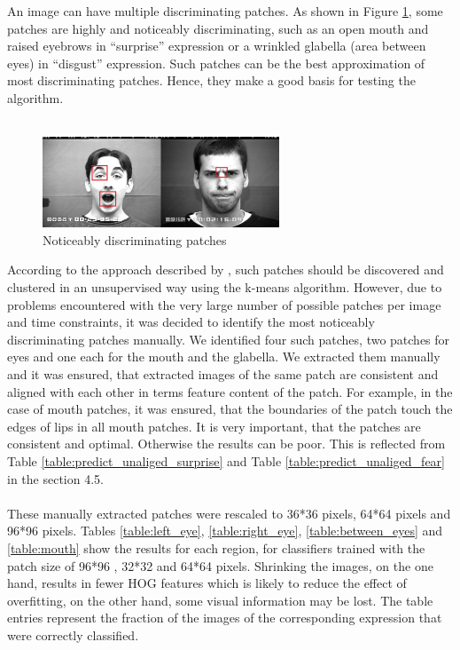 An image can have multiple discriminating patches. As shown in Figure \ref{fig:manual_patch}, some patches are highly and noticeably discriminating, such as an open mouth and raised eyebrows in "`surprise"' expression or a wrinkled glabella (area between eyes) in "`disgust"' expression. Such patches can be the best approximation of most discriminating patches. Hence, they make a good basis for testing the algorithm.
\\
\\
\begin{figure}
\centering
\includegraphics[width=200pt]{img/manual_patch.png}
  \caption{Noticeably discriminating patches}
  \label{fig:manual_patch}
\end{figure}
According to the approach described by \cite{Singh2012DiscPat}, such patches should be discovered and clustered in an unsupervised way using the k-means algorithm. However, due to problems encountered with the very large number of possible patches per image and time constraints, it was decided to identify the most noticeably discriminating patches manually. We identified four such patches, two patches for eyes and one each for the mouth and the glabella. We extracted them manually and it was ensured, that extracted images of the same patch are consistent and aligned with each other in terms feature content of the patch. For example, in the case of mouth patches, it was ensured, that the boundaries of the patch touch the edges of lips in all mouth patches. It is very important, that the patches are consistent and optimal. Otherwise the results can be poor. This is reflected from Table \ref{table:predict_unaliged_surprise} and Table \ref{table:predict_unaliged_fear} in the section 4.5.
\\
\\
These manually extracted patches were rescaled to 36*36 pixels, 64*64 pixels and 96*96 pixels. Tables \ref{table:left_eye}, \ref{table:right_eye}, \ref{table:between_eyes} and \ref{table:mouth} show the results for each region, for classifiers trained with the patch size of 96*96 , 32*32 and 64*64 pixels. Shrinking the images, on the one hand, results in fewer HOG features which is likely to reduce the effect of overfitting, on the other hand, some visual information may be lost. The table entries represent the fraction of the images of the corresponding expression that were correctly classified.

